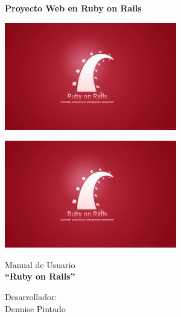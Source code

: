 

\vspace*{\fill}
\textbf{Proyecto Web en Ruby on Rails}
\vspace{5em}
\begin{center}
	\includegraphics[scale=0.5]{imagenes/ruby.jpg} 
\end{center}
	
\vspace*{\fill}


\newpage 
	
\vspace*{\fill}
\begin{center}
		
                        \includegraphics[scale=1.5]{imagenes/ruby.jpg} 
	\end{center}
	
			\begin{center}
				Manual de Usuario \\
				\vspace{5em}
				\Huge{\textbf{``Ruby on Rails''	\vspace{3em}}}
			\end{center}	
			
			


				\hspace*{5cm}Desarrollador:
				\\\hspace*{8cm}Dennise Pintado


\vspace*{\fill}
\newpage 


